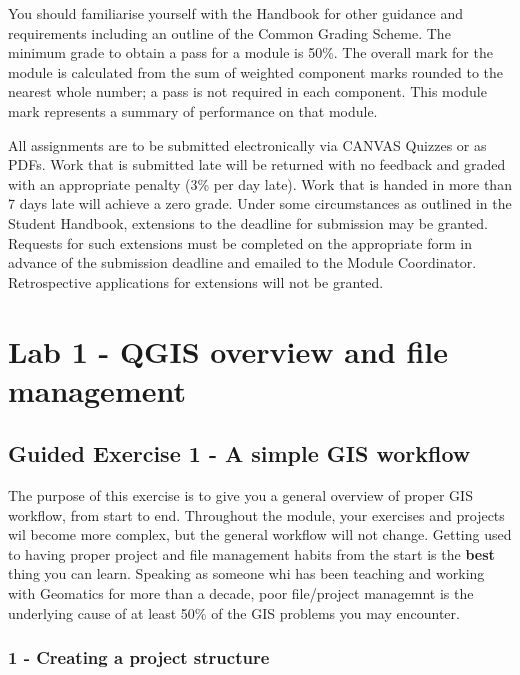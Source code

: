 \documentclass[
]{book}
\begin{document}
You should familiarise yourself with the Handbook for other guidance and requirements including an outline of the Common Grading Scheme. The minimum grade to obtain a pass for a module is 50\%. The overall mark for the module is calculated from the sum of weighted component marks rounded to the nearest whole number; a pass is not required in each component. This module mark represents a summary of performance on that module.

All assignments are to be submitted electronically via CANVAS Quizzes or as PDFs. Work that is submitted late will be returned with no feedback and graded with an appropriate penalty (3\% per day late). Work that is handed in more than 7 days late will achieve a zero grade. Under some circumstances as outlined in the Student Handbook, extensions to the deadline for submission may be granted. Requests for such extensions must be completed on the appropriate form in advance of the submission deadline and emailed to the Module Coordinator. Retrospective applications for
extensions will not be granted.

\hypertarget{lab1}{%
\chapter{Lab 1 - QGIS overview and file management}\label{lab1}}

\hypertarget{GE1}{%
\section{Guided Exercise 1 - A simple GIS workflow}\label{GE1}}

The purpose of this exercise is to give you a general overview of proper GIS workflow, from start to end. Throughout the module, your exercises and projects wil become more complex, but the general workflow will not change. Getting used to having proper project and file management habits from the start is the \textbf{best} thing you can learn. Speaking as someone whi has been teaching and working with Geomatics for more than a decade, poor file/project managemnt is the underlying cause of at least 50\% of the GIS problems you may encounter.

\hypertarget{creating-a-project-structure}{%
\subsection{1 - Creating a project structure}\label{creating-a-project-structure}}
\end{document}

